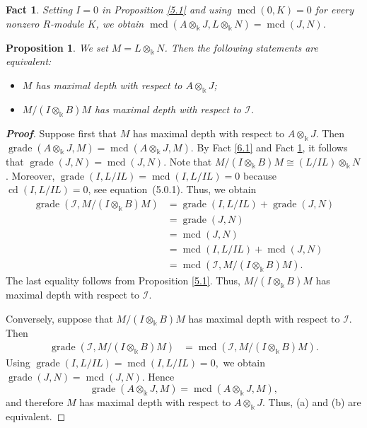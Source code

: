 \documentclass[10pt,a4paper]{amsart}
\numberwithin{equation}{theorem}
\newtheorem{proposition}[theorem]{Proposition}
\theoremstyle{definition}
\theoremstyle{fact}
\newtheorem{fact}[theorem]{Fact}
\theoremstyle{conjecture}
\newcommand{\grade}{\operatorname{grade}}
\newcommand{\cd}{\operatorname{cd}}
\newcommand{\mcd}{\operatorname{mcd}}
\newenvironment{prf}[1][Proof]{\begin{proof}[\bf #1]}{\end{proof}}
\begin{document}
\vspace{.2cm}
\vspace{.3cm}

\begin{fact}
\label{6.8}{\em
Setting $I=0$ in Proposition \ref{5.1} and using
$\mcd(0, K)=0$ for every nonzero $R$-module $K$,
we obtain $\mcd(A\otimes_\Bbbk J, L\otimes_\Bbbk N)=\mcd(J,N)$. }
\end{fact}

\begin{proposition}
\label{6.9}
We set $M=L\otimes_\Bbbk N$. Then the following statements are equivalent:
\begin{itemize}
\item[(a)] $M$ has maximal depth with respect to $A\otimes_{\Bbbk}J$;
\item[(b)] $M/(I\otimes_{\Bbbk}B)M$ has maximal depth with respect to
$\mathcal{I}$.
\end{itemize}
\end{proposition}

\begin{prf}
Suppose first that $M$ has maximal depth with respect to
$A\otimes_{\Bbbk}J$. Then
$
\grade(A\otimes_{\Bbbk}J,M)
=
\mcd(A\otimes_{\Bbbk}J,M).
$
By Fact \ref{6.1} and Fact \ref{6.8},  it follows that
$
\grade(J,N)=\mcd(J,N).
$
Note that $M/(I\otimes_{\Bbbk}B)M
\cong
(L/IL)\otimes_{\Bbbk}N$. Moreover, $\grade(I,L/IL)=\mcd(I,L/IL)=0$ because $\cd(I,L/IL)=0$, see equation~(5.0.1). Thus, we obtain
\[
\begin{aligned}
\grade\left(
\mathcal{I},
M/(I\otimes_{\Bbbk}B)M
\right)
&=
\grade(I,L/IL)+\grade(J,N)\\
&=
\grade(J,N)\\
&=
\mcd(J,N)\\
&=
\mcd(I,L/IL)+\mcd(J,N)\\
&=
\mcd\left(
\mathcal{I},
M/(I\otimes_{\Bbbk}B)M
\right).
\end{aligned}
\]
The last equality follows from Proposition \ref{5.1}.
Thus, $M/(I\otimes_{\Bbbk}B)M$ has maximal depth with respect to
$\mathcal{I}$.

Conversely, suppose that
$M/(I\otimes_{\Bbbk}B)M$ has maximal depth with respect to $\mathcal{I}$.
Then
\[
\begin{aligned}
\grade\left(
\mathcal{I},
M/(I\otimes_{\Bbbk}B)M
\right)
&=
\mcd\left(
\mathcal{I},
M/(I\otimes_{\Bbbk}B)M
\right).
\end{aligned}
\]
Using
$
\grade(I,L/IL)=\mcd(I,L/IL)=0,
$
we obtain
$
\grade(J,N)=\mcd(J,N).
$
Hence
\[
\grade(A\otimes_{\Bbbk}J,M)
=
\mcd(A\otimes_{\Bbbk}J,M),
\]
and therefore $M$ has maximal depth with respect to
$A\otimes_{\Bbbk}J$.
Thus, (a) and (b) are equivalent.
\end{prf}
\end{document}
